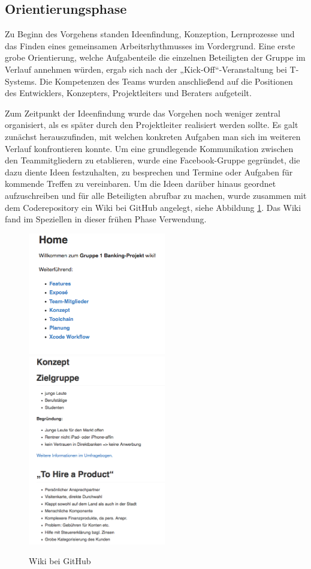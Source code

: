 \subsection{Orientierungsphase}
	Zu Beginn des Vorgehens standen Ideenfindung, Konzeption, Lernprozesse und das Finden eines gemeinsamen Arbeitsrhythmusses im Vordergrund. Eine erste grobe Orientierung, welche Aufgabenteile die einzelnen Beteiligten der Gruppe im Verlauf annehmen würden, ergab sich nach der „Kick-Off“-Veranstaltung bei T-Systems. Die Kompetenzen des Teams wurden anschließend auf die Positionen des Entwicklers, Konzepters, Projektleiters und Beraters aufgeteilt. 
	
	Zum Zeitpunkt der Ideenfindung wurde das Vorgehen noch weniger zentral organisiert, als es später durch den Projektleiter realisiert werden sollte. Es galt zunächst herauszufinden, mit welchen konkreten Aufgaben man sich im weiteren Verlauf konfrontieren konnte. Um eine grundlegende Kommunikation zwischen den Teammitgliedern zu etablieren, wurde eine Facebook-Gruppe gegründet, die dazu diente Ideen festzuhalten, zu besprechen und Termine oder Aufgaben für kommende Treffen zu vereinbaren. Um die Ideen darüber hinaus geordnet aufzuschreiben und für alle Beteiligten abrufbar zu machen, wurde zusammen mit dem Coderepository ein Wiki bei GitHub angelegt, siehe Abbildung \ref{fig:WikiHome}. Das Wiki fand im Speziellen in dieser frühen Phase Verwendung.
	
\begin{figure}[h]
	\centering
	\includegraphics[width=6cm]{Pictures/wiki_home}
	\includegraphics[width=6cm]{Pictures/wiki-konzept}
	\caption{Wiki bei GitHub\label{fig:WikiHome}}
\end{figure}

